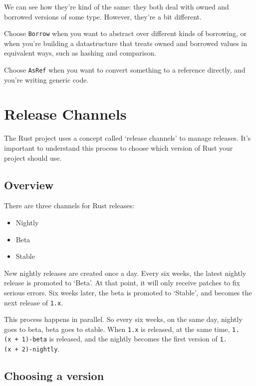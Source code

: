 \documentclass[a4paper,]{book}
\providecommand{\tightlist}{%
  \setlength{\itemsep}{0pt}\setlength{\parskip}{0pt}}
\begin{document}
We can see how they're kind of the same: they both deal with owned and
borrowed versions of some type. However, they're a bit different.

Choose \texttt{Borrow} when you want to abstract over different kinds of
borrowing, or when you're building a datastructure that treats owned and
borrowed values in equivalent ways, such as hashing and comparison.

Choose \texttt{AsRef} when you want to convert something to a reference
directly, and you're writing generic code.

\section{Release Channels}\label{sec--release-channels}

The Rust project uses a concept called `release channels' to manage
releases. It's important to understand this process to choose which
version of Rust your project should use.

\subsection{Overview}\label{overview}

There are three channels for Rust releases:

\begin{itemize}
\tightlist
\item
  Nightly
\item
  Beta
\item
  Stable
\end{itemize}

New nightly releases are created once a day. Every six weeks, the latest
nightly release is promoted to `Beta'. At that point, it will only
receive patches to fix serious errors. Six weeks later, the beta is
promoted to `Stable', and becomes the next release of \texttt{1.x}.

This process happens in parallel. So every six weeks, on the same day,
nightly goes to beta, beta goes to stable. When \texttt{1.x} is
released, at the same time, \texttt{1.(x\ +\ 1)-beta} is released, and
the nightly becomes the first version of \texttt{1.(x\ +\ 2)-nightly}.

\subsection{Choosing a version}\label{choosing-a-version}
\end{document}
